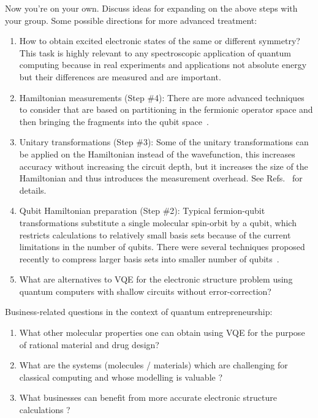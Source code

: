 \documentclass[12pt]{article}
\begin{document}
Now you're on your own.  Discuss ideas for expanding on the above steps with your group.  Some possible directions for more advanced treatment:
\begin{enumerate}
\item How to obtain excited electronic states of the same or different symmetry? This task is highly relevant to any spectroscopic 
application of quantum computing because in real experiments and applications not absolute energy but their differences are measured and are important.  

\item Hamiltonian measurements (Step \#4): There are more advanced techniques to consider that are based on partitioning in the fermionic operator space and then bringing the fragments into the qubit space~\cite{huggins2019efficient,Yen:2020tt}. 

\item Unitary transformations (Step \#3): Some of the unitary transformations can be applied on the Hamiltonian instead of the wavefunction, this increases 
accuracy without increasing the circuit depth, but it increases the size of the Hamiltonian and thus introduces the measurement overhead. 
See Refs.~\cite{Ryabinkin2019b,Lang:2020uv} for details. 

\item Qubit Hamiltonian preparation (Step \#2): Typical fermion-qubit transformations substitute a single molecular spin-orbit by a qubit, which restricts calculations to relatively small basis sets because of the current limitations in the number of qubits. There were several techniques proposed recently to 
compress larger basis sets into smaller number of qubits~\cite{Takeshita:2019wn,Bauman2019b}.

\item What are alternatives to VQE for the electronic structure problem using quantum computers with shallow circuits without error-correction?
  
\end{enumerate}

Business-related questions in the context of quantum entrepreneurship:

\begin{enumerate}
\item What other molecular properties one can obtain using VQE for the purpose of rational material and drug design?
\item What are the systems (molecules / materials) which are challenging for classical computing and whose modelling is valuable ?
\item What businesses can benefit from more accurate electronic structure calculations ?
\end{enumerate}



\end{document}
